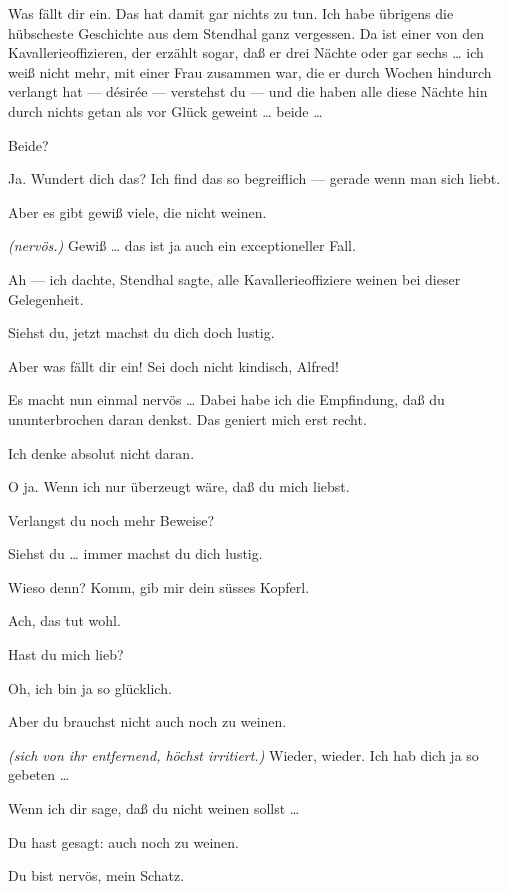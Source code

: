 \documentclass[
	final,
	a4paper,
	ngerman,
	mpinclude = true, %
	twoside = true,
	open = right,
	cleardoublepage = plain,
	DIV = 13,
	BCOR = 1cm,
	titlepage = firstiscover,
	]{scrbook}
\newcommand{\direction}[1]{\textit{(#1)}}
\newcommand{\thecharacter}[1]{\textup{\textsc{#1}}}
\newcommand{\theherr}{\thecharacter{Junger Herr}}
\newcommand{\thefrau}{\thecharacter{Junge Frau}}
\newcommand{\character}[1]{\item[#1:]}
\newcommand{\herr}{\character{\theherr}}
\newcommand{\frau}{\character{\thefrau}}
\begin{document}
\begin{play}
	\herr
	Was fällt dir ein. Das hat damit gar nichts zu tun. Ich habe übrigens die hübscheste Geschichte aus dem Stendhal ganz vergessen. Da ist einer von den Kavallerieoffizieren, der erzählt sogar, daß er drei Nächte oder gar sechs \ldots{} ich weiß nicht mehr, mit einer Frau zusammen war, die er durch Wochen hindurch verlangt hat --- désirée --- verstehst du --- und die haben alle diese Nächte hin durch nichts getan als vor Glück geweint \ldots{} beide \ldots{}

	\frau
	Beide?

	\herr
	Ja. Wundert dich das? Ich find das so begreiflich --- gerade wenn man sich liebt.

	\frau
	Aber es gibt gewiß viele, die nicht weinen.

	\herr
	\direction{nervös.} Gewiß \ldots{} das ist ja auch ein exceptioneller Fall.

	\frau
	Ah --- ich dachte, Stendhal sagte, alle Kavallerieoffiziere weinen bei dieser Gelegenheit.

	\herr
	Siehst du, jetzt machst du dich doch lustig.

	\frau
	Aber was fällt dir ein! Sei doch nicht kindisch, Alfred!

	\herr
	Es macht nun einmal nervös \ldots{} Dabei habe ich die Empfindung, daß du ununterbrochen daran denkst. Das geniert mich erst recht.

	\frau
	Ich denke absolut nicht daran.

	\herr
	O ja. Wenn ich nur überzeugt wäre, daß du mich liebst.

	\frau
	Verlangst du noch mehr Beweise?

	\herr
	Siehst du \ldots{} immer machst du dich lustig.

	\frau
	Wieso denn? Komm, gib mir dein süsses Kopferl.

	\herr
	Ach, das tut wohl.

	\frau
	Hast du mich lieb?

	\herr
	Oh, ich bin ja so glücklich.

	\frau
	Aber du brauchst nicht auch noch zu weinen.

	\herr
	\direction{sich von ihr entfernend, höchst irritiert.} Wieder, wieder. Ich hab dich ja so gebeten \ldots{}

	\frau
	Wenn ich dir sage, daß du nicht weinen sollst \ldots{}

	\herr
	Du hast gesagt: auch noch zu weinen.

	\frau
	Du bist nervös, mein Schatz.


\end{play}
\end{document}
